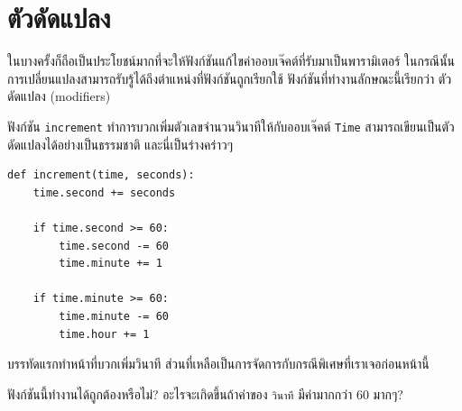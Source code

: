 \section{ตัวดัดแปลง} %
\label{increment}


ในบางครั้งก็ถือเป็นประโยชน์มากที่จะให้ฟังก์ชันแก้ไขค่าออบเจ๊คต์ที่รับมาเป็นพารามิเตอร์  
ในกรณีนั้นการเปลี่ยนแปลงสามารถรับรู้ได้ถึงตำแหน่งที่ฟังก์ชันถูกเรียกใช้ ฟังก์ชันที่ทำงานลักษณะนี้เรียกว่า ตัวดัดแปลง (modifiers)


ฟังก์ชัน {\tt increment} ทำการบวกเพิ่มตัวเลขจำนวนวินาทีให้กับออบเจ๊คต์ {\tt Time} สามารถเขียนเป็นตัวดัดแปลงได้อย่างเป็นธรรมชาติ และนี่เป็นร่างคร่าวๆ

\begin{verbatim}
def increment(time, seconds):
    time.second += seconds

    if time.second >= 60:
        time.second -= 60
        time.minute += 1

    if time.minute >= 60:
        time.minute -= 60
        time.hour += 1
\end{verbatim}
%

บรรทัดแรกทำหน้าที่บวกเพิ่มวินาที ส่วนที่เหลือเป็นการจัดการกับกรณีพิเศษที่เราเจอก่อนหน้านี้

ฟังก์ชันนี้ทำงานได้ถูกต้องหรือไม่? อะไรจะเกิดขึ้นถ้าค่าของ {\tt วินาที} มีค่ามากกว่า 60 มากๆ?



